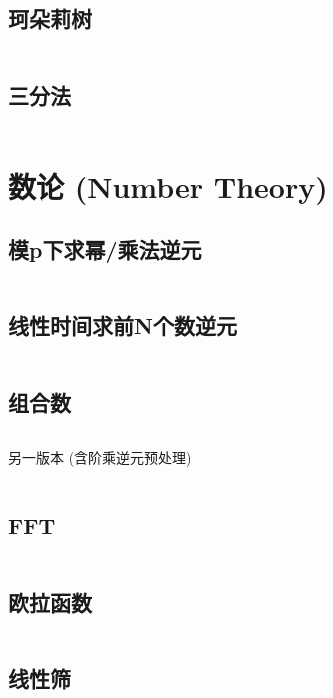 \documentclass[openany,a4paper]{book}
\begin{document}

\section{珂朵莉树}
\inputminted{cpp}{Algorithm/ChthollyTree.h}

\section{三分法}
\inputminted{cpp}{Algorithm/ternary.hpp}

\chapter{数论 (Number Theory)} %

\section{模p下求幂/乘法逆元}
\inputminted{cpp}{NumberTheory/modPow.hpp}

\section{线性时间求前N个数逆元}
\inputminted{cpp}{NumberTheory/linearInv.hpp}

\section{组合数}
\inputminted{cpp}{NumberTheory/Binomial.h}
另一版本 (含阶乘逆元预处理)
\inputminted{cpp}{NumberTheory/Combinations.h}

\section{FFT}
\inputminted{cpp}{NumberTheory/FFT.h}

\section{欧拉函数}
\inputminted{cpp}{NumberTheory/EulerFunction.h}

\section{线性筛}
\inputminted{cpp}{NumberTheory/linearSieve.h}
\end{document}
